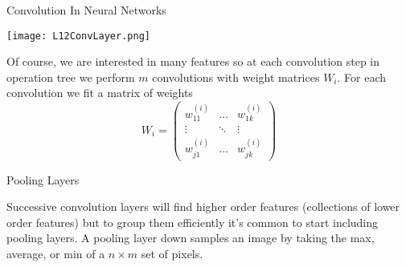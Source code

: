 \documentclass[10pt, table, dvipsnames,xcdraw, handout]{beamer}
\def\layersep{2.5cm}
\begin{document}
\begin{frame}[fragile]{Convolution In Neural Networks}
  \begin{minipage}[t][0.5\textheight][t]{\textwidth}\centering
	\centering \texttt{[image: L12ConvLayer.png]} 
  \end{minipage}
  \vfill
\begin{minipage}[t][0.5\textheight][t]{\textwidth}
Of course, we are interested in many features so at each convolution step in operation tree we perform $m$ convolutions with weight matrices $W_i$. \pause For each convolution we fit a matrix of weights 
$$
W_i = \left(\begin{matrix}
w^{(i)}_{11}&\ldots&w^{(i)}_{1k}
\\
\vdots &\ddots&\vdots
\\
w^{(i)}_{j1}&\ldots&w^{(i)}_{jk}
\end{matrix}\right)
$$
\end{minipage}
\end{frame}






\begin{frame}[fragile]{Pooling Layers}
  \begin{minipage}[t][0.5\textheight][t]{\textwidth}\centering
{}
  \end{minipage}
  \vfill
\begin{minipage}[t][0.5\textheight][t]{\textwidth}
Successive convolution layers will find higher order features (collections of lower order features) but to group them efficiently it's common to start including pooling layers. A pooling layer down samples an image by taking the max, average, or min of a $n\times m$ set of pixels. 
\end{minipage}
\end{frame}
\end{document}
